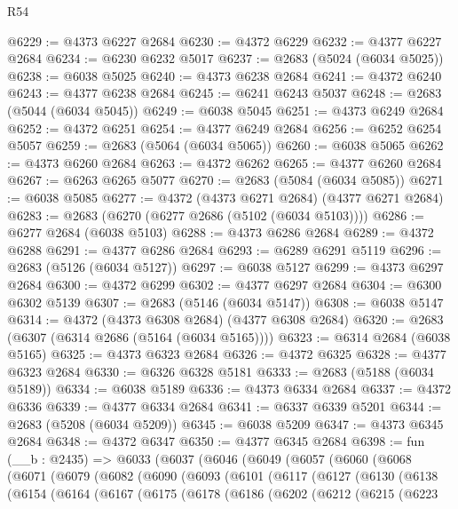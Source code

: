 \begin{lexlean}{R54}
\begin{coremodule}
@6229 := @4373 @6227 @2684
@6230 := @4372 @6229
@6232 := @4377 @6227 @2684
@6234 := @6230 @6232 @5017
@6237 := @2683 (@5024 (@6034 @5025))
@6238 := @6038 @5025
@6240 := @4373 @6238 @2684
@6241 := @4372 @6240
@6243 := @4377 @6238 @2684
@6245 := @6241 @6243 @5037
@6248 := @2683 (@5044 (@6034 @5045))
@6249 := @6038 @5045
@6251 := @4373 @6249 @2684
@6252 := @4372 @6251
@6254 := @4377 @6249 @2684
@6256 := @6252 @6254 @5057
@6259 := @2683 (@5064 (@6034 @5065))
@6260 := @6038 @5065
@6262 := @4373 @6260 @2684
@6263 := @4372 @6262
@6265 := @4377 @6260 @2684
@6267 := @6263 @6265 @5077
@6270 := @2683 (@5084 (@6034 @5085))
@6271 := @6038 @5085
@6277 := @4372 (@4373 @6271 @2684) (@4377 @6271 @2684)
@6283 := @2683 (@6270 (@6277 @2686 (@5102 (@6034 @5103))))
@6286 := @6277 @2684 (@6038 @5103)
@6288 := @4373 @6286 @2684
@6289 := @4372 @6288
@6291 := @4377 @6286 @2684
@6293 := @6289 @6291 @5119
@6296 := @2683 (@5126 (@6034 @5127))
@6297 := @6038 @5127
@6299 := @4373 @6297 @2684
@6300 := @4372 @6299
@6302 := @4377 @6297 @2684
@6304 := @6300 @6302 @5139
@6307 := @2683 (@5146 (@6034 @5147))
@6308 := @6038 @5147
@6314 := @4372 (@4373 @6308 @2684) (@4377 @6308 @2684)
@6320 := @2683 (@6307 (@6314 @2686 (@5164 (@6034 @5165))))
@6323 := @6314 @2684 (@6038 @5165)
@6325 := @4373 @6323 @2684
@6326 := @4372 @6325
@6328 := @4377 @6323 @2684
@6330 := @6326 @6328 @5181
@6333 := @2683 (@5188 (@6034 @5189))
@6334 := @6038 @5189
@6336 := @4373 @6334 @2684
@6337 := @4372 @6336
@6339 := @4377 @6334 @2684
@6341 := @6337 @6339 @5201
@6344 := @2683 (@5208 (@6034 @5209))
@6345 := @6038 @5209
@6347 := @4373 @6345 @2684
@6348 := @4372 @6347
@6350 := @4377 @6345 @2684
@6398 := fun (__b : @2435) =>
  @6033
    (@6037
      (@6046
        (@6049
          (@6057
            (@6060
              (@6068
                (@6071
                  (@6079
                    (@6082
                      (@6090
                        (@6093
                          (@6101
                            (@6117
                              (@6127
                                (@6130
                                  (@6138
                                    (@6154
                                      (@6164
                                        (@6167
                                          (@6175
                                            (@6178
                                              (@6186
                                                (@6202
                                                  (@6212
                                                    (@6215
                                                      (@6223

\end{coremodule}
\end{lexlean}
